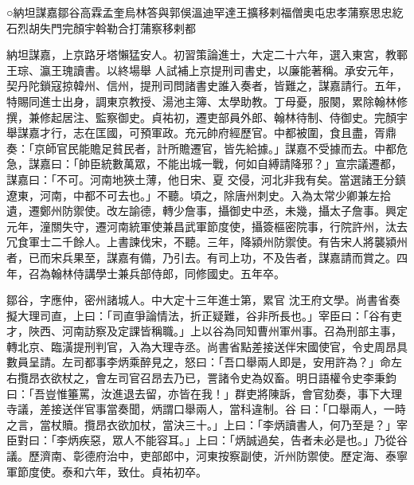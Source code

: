 
\begin{pinyinscope}

 ○納坦謀嘉鄒谷高霖孟奎烏林答與郭俁溫迪罕達王擴移剌福僧奧屯忠孝蒲察思忠紇石烈胡失門完顏宇斡勒合打蒲察移剌都



 納坦謀嘉，上京路牙塔懶猛安人。初習策論進士，大定二十六年，選入東宮，教鄆王琮、瀛王瑰讀書。以終場舉
 人試補上京提刑司書史，以廉能著稱。承安元年，契丹陀鎖寇掠韓州、信州，提刑司問諸書史誰入奏者，皆難之，謀嘉請行。五年，特賜同進士出身，調東京教授、湯池主簿、太學助教。丁母憂，服闋，累除翰林修撰，兼修起居注、監察御史。貞祐初，遷吏部員外郎、翰林待制、侍御史。完顏宇舉謀嘉才行，志在匡國，可預軍政。充元帥府經歷官。中都被圍，食且盡，胥鼎奏：「京師官民能贍足貧民者，計所贍遷官，皆先給據。」謀嘉不受據而去。中都危急，謀嘉曰：「帥臣統數萬眾，不能出城一戰，何如自縛請降邪？」宣宗議遷都，謀嘉曰：「不可。河南地狹土薄，他日宋、夏
 交侵，河北非我有矣。當選諸王分鎮遼東，河南，中都不可去也。」不聽。頃之，除唐州刺史。入為太常少卿兼左拾遺，遷鄭州防禦使。改左諭德，轉少詹事，攝御史中丞，未幾，攝太子詹事。興定元年，潼關失守，遷河南統軍使兼昌武軍節度使，攝簽樞密院事，行院許州，汰去冗食軍士二千餘人。上書諫伐宋，不聽。三年，降潁州防禦使。有告宋人將襲潁州者，已而宋兵果至，謀嘉有備，乃引去。有司上功，不及告者，謀嘉請而賞之。四年，召為翰林侍講學士兼兵部侍郎，同修國史。五年卒。



 鄒谷，字應仲，密州諸城人。中大定十三年進士第，累官
 沈王府文學。尚書省奏擬大理司直，上曰：「司直爭論情法，折正疑難，谷非所長也。」宰臣曰：「谷有吏才，陜西、河南訪察及定課皆稱職。」上以谷為同知曹州軍州事。召為刑部主事，轉北京、臨潢提刑判官，入為大理寺丞。尚書省點差接送伴宋國使官，令史周昂具數員呈請。左司都事李炳乘醉見之，怒曰：「吾口舉兩人即是，安用許為？」命左右攬昂衣欲杖之，會左司官召昂去乃已，詈諸令史為奴畜。明日語權令史李秉鈞曰：「吾豈惟箠罵，汝進退去留，亦皆在我！」群吏將陳訴，會官劾奏，事下大理寺議，差接送伴官事當奏聞，炳謂口舉兩人，當科違制。谷
 曰：「口舉兩人，一時之言，當杖贖。攬昂衣欲加杖，當決三十。」上曰：「李炳讀書人，何乃至是？」宰臣對曰：「李炳疾惡，眾人不能容耳。」上曰：「炳誠過矣，告者未必是也。」乃從谷議。歷濟南、彰德府治中，吏部郎中，河東按察副使，沂州防禦使。歷定海、泰寧軍節度使。泰和六年，致仕。貞祐初卒。




\end{pinyinscope}
